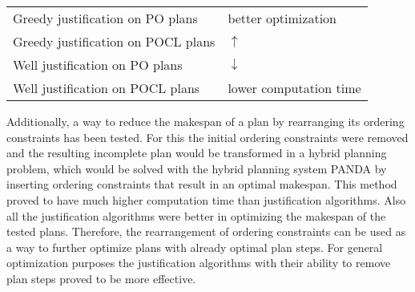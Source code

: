 \begin{tabular}{|l|l|}
    \hline
    Greedy justification on PO plans&better optimization\\
    \cline{1-1}
    Greedy justification on POCL plans& $\uparrow$\\
    \cline{1-1}
    Well justification on PO plans & $\downarrow$\\
    \cline{1-1}
    Well justification on POCL plans &lower computation time\\
    \hline
\end{tabular}
\newline


Additionally, a way to reduce the makespan of a plan by rearranging its ordering constraints has been tested.
For this the initial ordering constraints were removed and the resulting incomplete plan would be transformed in a hybrid planning problem,
which would be solved with the hybrid planning system PANDA \cite{Panda} by inserting ordering constraints that result in an optimal makespan. 
This method proved to have much higher computation time than justification algorithms.
Also all the justification algorithms were better in optimizing the makespan of the tested plans.
Therefore, the rearrangement of ordering constraints can be used as a way to further optimize plans with already optimal plan steps.
For general optimization purposes the justification algorithms with their ability to remove plan steps proved to be more effective. 


